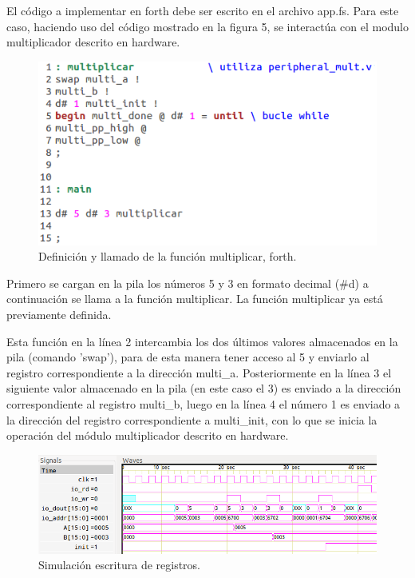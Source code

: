 \documentclass[a4paper,10pt]{article}
\begin{document}
El código a implementar en forth debe ser escrito en el archivo app.fs.  Para este caso, haciendo uso del código mostrado en la figura 5, se interactúa con el modulo multiplicador descrito en hardware.


\begin{figure}[H]	%
  \centering
    \includegraphics[scale=0.7]{forth_mult.png}
      \caption{Definición y llamado de la función multiplicar, forth.}
	\label{fig5}
\end{figure}


Primero se cargan en la pila los números 5 y 3  en formato decimal (\#d) a continuación se llama a la función multiplicar. La función multiplicar ya está previamente definida.

Esta función en la línea 2 intercambia los dos últimos valores almacenados en la pila (comando 'swap'), para de esta manera tener acceso al 5 y enviarlo al registro correspondiente a la dirección multi\_a. Posteriormente en la línea 3 el siguiente valor almacenado en la pila (en este caso el 3) es enviado a la dirección correspondiente al registro multi\_b, luego en la línea 4 el número 1 es enviado a la dirección del registro correspondiente a multi\_init, con lo que se inicia la operación del módulo multiplicador descrito en hardware.

\begin{figure}[H]	%
  \centering
    \includegraphics[scale=0.7]{sim_write_mult.png}
      \caption{Simulación escritura de registros.}
	\label{fig6}
\end{figure}
\end{document}
